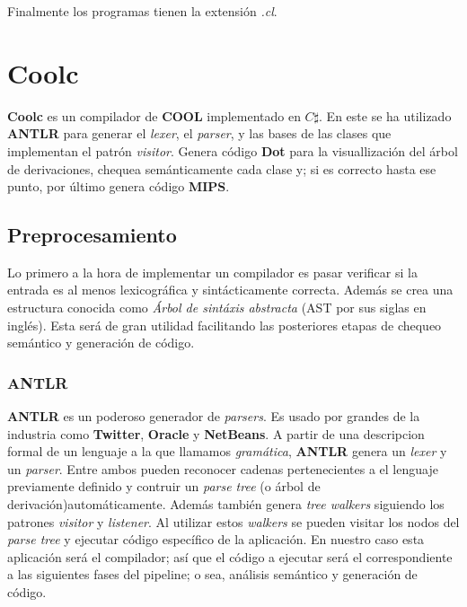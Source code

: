 \documentclass[]{article}
\begin{document}
	Finalmente los programas tienen la extensión \textit{.cl}.
\section{Coolc}\label{sec:coolc}
	\textbf{Coolc} es un compilador de \textbf{COOL} implementado en \textbf{$C\sharp$}. En este se ha utilizado \textbf{ANTLR} para generar el \textit{lexer}, el \textit{parser}, y las bases de las clases que implementan el patrón \textit{visitor}. Genera código \textbf{Dot} para la visuallización del árbol de derivaciones, chequea semánticamente cada clase y; si es correcto hasta ese punto, por último genera código \textbf{MIPS}.

	\subsection{Preprocesamiento}\label{sec:prep}
		Lo primero a la hora de implementar un compilador es pasar verificar si la entrada es al menos lexicográfica y sintácticamente correcta. Además se crea una estructura conocida como \textit{\'Arbol de sintáxis abstracta} (AST por sus siglas en inglés). Esta será de gran utilidad facilitando las posteriores etapas de chequeo semántico y generación de código.
		\subsubsection{ANTLR}\label{sec:antlr}
			\textbf{ANTLR} es un poderoso generador de \textit{parsers}. Es usado por grandes de la industria como \textbf{Twitter}, \textbf{Oracle} y \textbf{NetBeans}. A partir de una descripcion formal de un lenguaje a la que llamamos \textit{gramática}, \textbf{ANTLR} genera un \textit{lexer} y un \textit{parser}. Entre ambos pueden reconocer cadenas pertenecientes a el lenguaje previamente definido y contruir un \textit{parse tree} (o árbol de derivación)automáticamente. Además también genera \textit{tree walkers} siguiendo los patrones \textit{visitor} y \textit{listener}. Al utilizar estos \textit{walkers} se pueden visitar los nodos del \textit{parse tree} y ejecutar código específico de la aplicación. En nuestro caso esta aplicación será el compilador; así que el código a ejecutar será el correspondiente a las siguientes fases del pipeline; o sea, análisis semántico y generación de código.

			\begin{center}
				{ 
				\fboxsep 12pt
				 }
			\end{center}
\end{document}
